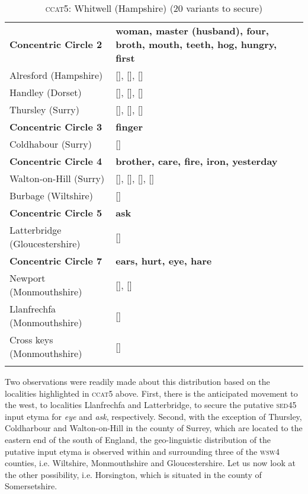 \begin{table}
\begin{tabularx}{\textwidth}{lQ}
\lsptoprule 
\textbf{Concentric Circle 2} & \textbf{woman, master (husband), four, broth, mouth, teeth, hog, hungry, first} \\  
Alresford (Hampshire) & [], [], []  \\
Handley (Dorset) & [], [], [] \\
Thursley (Surry) & [], [], [] \\

\textbf{Concentric Circle 3} &\textbf{finger} \\
Coldhabour (Surry) & [] \\

\textbf{Concentric Circle 4} & \textbf{brother, care, fire, iron, yesterday}\\ 
Walton-on-Hill (Surry) & [], [], [], [] \\
Burbage (Wiltshire) & [] \\

\textbf{Concentric Circle 5} & \textbf{ask}\\ 
Latterbridge (Gloucestershire) & [] \\

\textbf{Concentric Circle 7} & \textbf{ears, hurt, eye, hare}\\ 
Newport (Monmouthshire) & [], [] \\
Llanfrechfa (Monmouthshire) & []\\
Cross keys (Monmouthshire) & []\\
\lspbottomrule 
\end{tabularx}
\caption{\textsc{ccat5}: Whitwell (Hampshire)  (20 variants to secure)}
\label{Table 5.6}
\end{table}

Two observations were readily made about this distribution based on the localities highlighted in \textsc{ccat5} above. First, there is the anticipated movement to the west, to localities Llanfrechfa and Latterbridge, to secure the putative \textsc{sed45} input etyma for \emph{eye} and \emph{ask}, respectively. Second, with the exception of Thursley, Coldharbour and Walton-on-Hill in the county of Surrey, which are located to the eastern end of the south of England, the geo-linguistic distribution of the putative input etyma is observed within and surrounding three of the \textsc{wsw4} counties, i.e. Wiltshire, Monmouthshire and Gloucestershire. Let us now look at the other possibility, i.e. Horsington, which is situated in the county of Somersetshire.
\clearpage


